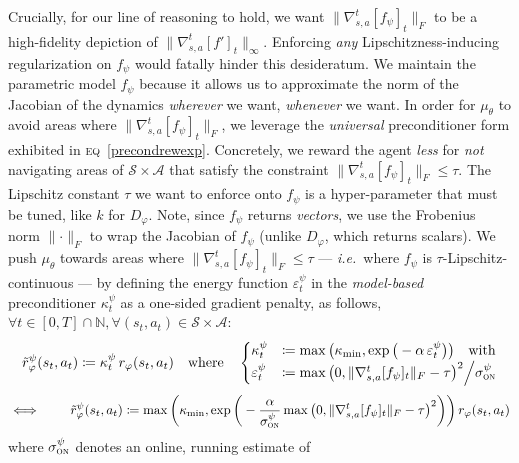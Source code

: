 Crucially, for our line of reasoning to hold, we want $\lVert\nabla_{s,a}^t[f_\psi]_t\rVert _F$ to be
a high-fidelity depiction of $\lVert\nabla_{s,a}^t[f']_t\rVert _\infty$.
Enforcing \emph{any} Lipschitzness-inducing regularization on $f_\psi$ would fatally hinder
this desideratum.
We maintain the parametric model $f_\psi$
because it allows us to approximate the norm of the Jacobian of the dynamics
\emph{wherever} we want, \emph{whenever} we want.
In order for $\mu_\theta$ to avoid areas where $\lVert\nabla_{s,a}^t[f_\psi]_t\rVert _F$,
we leverage the \emph{universal} preconditioner form exhibited in \textsc{eq}~\ref{precondrewexp}.
Concretely, we reward the agent \emph{less} for
\emph{not} navigating areas of $\mathcal{S} \times \mathcal{A}$ that satisfy the constraint
$\lVert\nabla_{s,a}^t[f_\psi]_t\rVert _F \leq \tau$.
The Lipschitz constant $\tau$ we want to enforce onto $f_\psi$ is a hyper-parameter that must be tuned,
like $k$ for $D_\varphi$.
Note, since $f_\psi$ returns \emph{vectors},
we use the Frobenius norm
$\lVert\cdot\rVert _F$
to wrap the Jacobian of $f_\psi$
(unlike $D_\varphi$, which returns scalars).
We push $\mu_\theta$ towards areas where $\lVert\nabla_{s,a}^t[f_\psi]_t\rVert _F \leq \tau$
--- \textit{i.e.}~where $f_\psi$ is $\tau$-Lipschitz-continuous ---
by defining the energy function $\varepsilon_t^\psi$ in the
\emph{model-based} preconditioner $\kappa_t^\psi$ as a one-sided gradient penalty, as follows,
$\forall t \in [0, T] \cap \mathbb{N},
\forall (s_t, a_t) \in \mathcal{S} \times \mathcal{A}$:
\begin{align}
\tilde{r}_\varphi^\psi (s_t,a_t)
\coloneqq \kappa_t^\psi \, r_\varphi (s_t,a_t)
\quad \text{where} \quad
\begin{cases}
\kappa_t^\psi &\coloneqq \max\big(\kappa_\text{min}, \exp \big(-\alpha \, \varepsilon_t^\psi\big)\big)
\quad \text{with} \\
\varepsilon_t^\psi &\coloneqq
\max \big(0, \lVert\nabla_{s,a}^t[f_\psi]_t\rVert _F - \tau\big)^2 \Big/ \sigma_\textsc{on}^\psi
\end{cases}
\label{precondrewf1}
\end{align}
\begin{align}
\iff \qquad
\tilde{r}_\varphi^\psi(s_t,a_t)
\coloneqq \max\bigg(\kappa_\text{min}, \exp \bigg(- \frac{\alpha}{\sigma_\textsc{on}^\psi}
\max \big(0, \lVert\nabla_{s,a}^t[f_\psi]_t\rVert _F - \tau\big)^2\bigg)\bigg)
\, r_\varphi (s_t,a_t)
\label{precondrewf2}
\end{align}
where
$\sigma_\textsc{on}^\psi$ denotes an online, running estimate of
